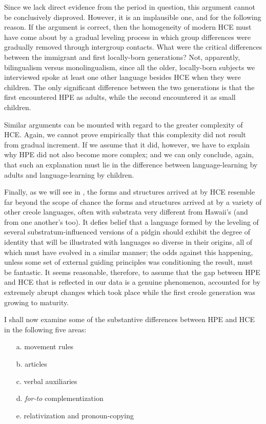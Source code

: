 Since we lack direct evidence from the period in question, this argument cannot be conclusively disproved. However, it is an im\-plausible one, and for the following reason. If the argument is correct, then the homogeneity of modern HCE must have come about by a gradual leveling process in which group differences were gradually removed through intergroup contacts. What were the critical differ\-ences between the immigrant and first locally-born generations? Not, apparently, bilingualism versus monolingualism, since all the older, locally-born subjects we interviewed spoke at least one other language besides HCE when they were children. The only significant difference between the two generations is that the first encountered HPE as adults, while the second encountered it as small children.

Similar arguments can be mounted with regard to the greater complexity of HCE. Again, we cannot prove empirically that this complexity did not result from gradual increment. If we assume that it did, however, we have to explain why HPE did not also become more complex; and we can only conclude, again, that such an explanation must lie in the difference between language-learning by adults and language-learning by children.

Finally, as we will see in , the forms and structures arrived at by HCE resemble far beyond the scope of chance the forms
and structures arrived at by a variety of other creole languages, often with substrata very different from Hawaii's (and from one another's too). It defies belief that a language formed by the leveling of several substratum-influenced versions of a pidgin should exhibit the degree of identity that will be illustrated with languages so diverse in their origins, all of which must have evolved in a similar manner; the odds against this happening, unless some set of external guiding principles was condi\-tioning the result, must be fantastic. It seems reasonable, therefore, to assume that the gap between HPE and HCE that is reflected in our data is a genuine phenomenon, accounted for by extremely abrupt changes which took place while the first creole generation was growing to maturity.

\largerpage[-1]
I shall now examine some of the substantive differences between HPE and HCE in the following five areas:

\begin{enumerate}
\item[a.] movement rules
\item[b.] articles
\item[c.] verbal auxiliaries
\item[d.] \textit{for-to} complementization
\item[e.] relativization and pronoun-copying
\end{enumerate}
 
